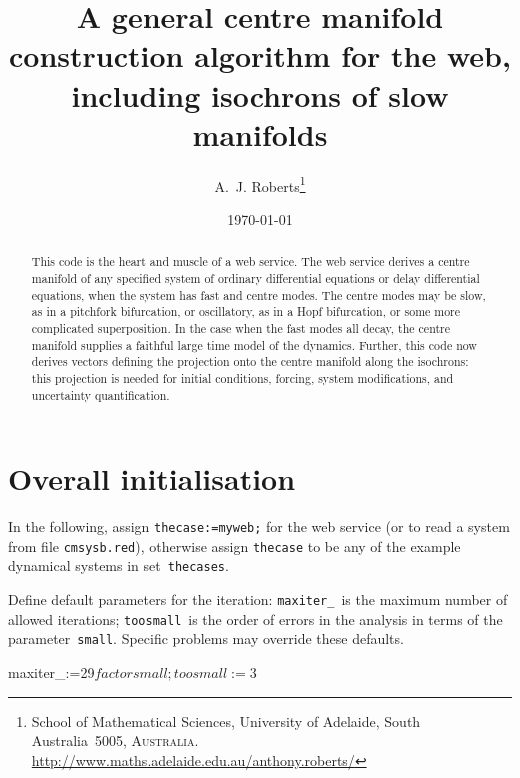 \documentclass[11pt,a5paper]{article}
\title{A general centre manifold construction algorithm for the web, including isochrons of slow manifolds}
\author{A.~J. Roberts\thanks{School of Mathematical Sciences, University of Adelaide, South Australia~5005, \textsc{Australia}.
\url{http://www.maths.adelaide.edu.au/anthony.roberts/}}}
\date{\today}
\begin{document}
\maketitle

\begin{abstract}
This code is the heart and muscle of a web service.
The web service derives a centre manifold of any specified system of ordinary differential equations or delay differential equations, when the system has fast and centre modes. 
The centre modes may be slow, as in a pitchfork bifurcation, or oscillatory, as in a Hopf bifurcation, or some more complicated superposition. 
In the case when the fast modes all decay, the centre manifold supplies a faithful large time model of the dynamics. 
Further, this code now derives vectors defining the projection onto the centre manifold along the isochrons: this projection is needed for initial conditions, forcing, system modifications, and uncertainty quantification.
\end{abstract}

\tableofcontents

\section{Overall initialisation}

In the following, assign \verb|thecase:=myweb;| for the web service (or to read a system from file \verb|cmsysb.red|), otherwise assign \verb|thecase| to be any of the example dynamical systems in set~\verb|thecases|.

Define default parameters for the iteration:
\verb|maxiter_|~is the maximum number of allowed iterations;
\verb|toosmall|~is the order of errors in the analysis in terms of the parameter~\verb|small|.
Specific problems may override these defaults.

\begin{reduce}
maxiter_:=29$
factor small; 
toosmall:=3$
\end{reduce}
\end{document}
